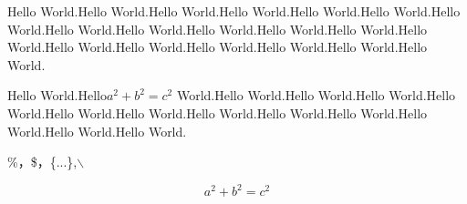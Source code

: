 \documentclass{article} %
\begin{document}
Hello World.Hello World.Hello World.Hello World.Hello World.Hello World.Hello World.Hello World.Hello World.Hello World.Hello World.Hello World.Hello World.Hello World.Hello World.Hello World.Hello World.Hello World.Hello World.

Hello World.Hello$a^2+b^2=c^2$ World.Hello World.Hello World.Hello World.Hello World.Hello World.Hello World.Hello World.Hello World.Hello World.Hello World.Hello World.Hello World.

\%，\$，\{...\},$\backslash$

$$a^2+b^2=c^2$$
\end{document}
